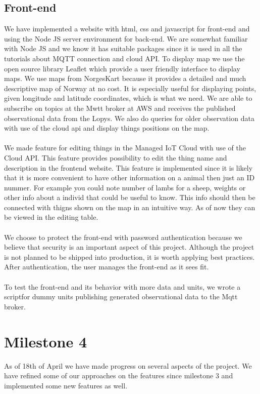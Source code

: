 	\subsection{Front-end}
		We have implemented a website with html, css and javascript for front-end and using the Node JS server environment for back-end. We are somewhat familiar with Node JS and we know it has suitable packages since it is used in all the tutorials about MQTT connection and cloud API.  To display map we use the open source library Leaflet which provide a user friendly interface to display maps. We use maps from NorgesKart because it provides a detailed and much descriptive map of Norway at no cost. It is especially useful for displaying points, given longitude and latitude coordinates, which is what we need. We are able to subscribe on topics at the Mwtt broker at AWS and receives the published observational data from the Lopys. We also do queries for older observation data with use of the cloud api and display things positions on the map. 
		\\\\
		We made feature for editing things in the Managed IoT Cloud with use of the Cloud API. This feature provides possibility to edit the thing name and description in the frontend website. This feature is implemented since it is likely that it is more convenient to have other information on a animal then just an ID nummer. For example you could note number of lambs for a sheep, weights or other info about a individ that could be useful to know. This info should then be connected with thigns shown on the map in an intuitive way. As of now they can be viewed in the editing table.  
		\\\\
		We choose to protect the front-end with password authentication because we believe that security is an important aspect of this project. Although the project is not planned to be shipped into production, it is worth applying best practices. After authentication, the user manages the front-end as it sees fit.
		\\\\
		To test the front-end and its behavior with more data and units, we wrote a scriptfor dummy units publishing generated observational data to the Mqtt broker.   
		
\section{Milestone 4}
	As of 18th of April we have made progress on several aspects of the project. We have refined some of our approaches on the features since milestone 3 and implemented some new features as well. 
